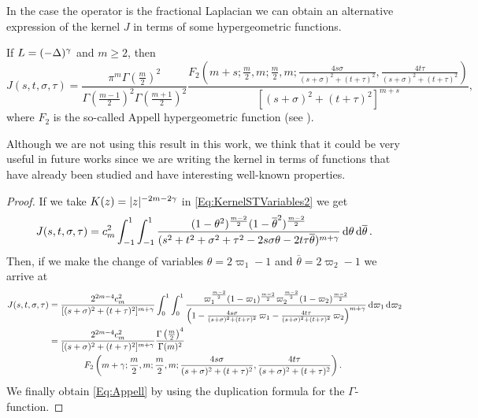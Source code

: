 In the case the operator is the fractional Laplacian we can obtain an alternative expression of the
kernel $J$ in terms of some hypergeometric functions.
\begin{lemma}
\label{Lemma:Appell} If $L = (-\Delta)^\gamma$ and $m\geq 2$, then
\begin{equation}
\label{Eq:Appell}
J(s,t,\sigma,\tau) = \frac{\pi^m\Gamma\left(\frac{m}{2}\right)^2}{\Gamma\left(\frac{m-1}{2}\right)^2\Gamma\left(\frac{m+1}{2}\right)^2} \frac{F_2\left( m+s;\frac{m}{2},m;\frac{m}{2},m;\frac{4s\sigma}{(s+\sigma)^2+(t+\tau)^2},\frac{4t\tau}{(s+\sigma)^2+(t+\tau)^2} \right)}{[(s+\sigma)^2+(t+\tau)^2]^{m+s}},
\end{equation}
where $F_2$ is the so-called Appell hypergeometric function (see \cite{Appell}).
\end{lemma}
Although we are not using this result in this work, we think that it could be very useful in future
works since we are writing the kernel in terms of functions that have already been studied and have
interesting well-known properties.


\begin{proof}
If we take $K(z) = |z|^{-2m-2\gamma}$ in \eqref{Eq:KernelSTVariables2} we get
\begin{align*}
J(s,t,\sigma, \tau) = c_m ^2  \int_{-1}^1  \int_{-1}^1  \frac{(1-\theta^2)^{\frac{m-2}{2}} (1-\overline{\theta}^2)^{\frac{m-2}{2}}}{(s^2 + t^2 + \sigma^2 + \tau^2 -2 s \sigma \theta -2 t \tau \overline{\theta})^{m+\gamma}} \,\mathrm{d} \theta \,\mathrm{d} \overline{\theta}\,.
\end{align*}
Then, if we make the change of variables $\theta = 2\varpi_1-1$ and $\overline{\theta}=2\varpi_2-1$
we arrive at
\begin{align*}
J(s,t,\sigma, \tau) &= \frac{2^{2m-4} c_m^2}{[(s+\sigma)^2+(t+\tau)^2]^{m+\gamma}} \int_0^1 \int_0^1
\frac{\varpi_1^\frac{m-2}{2} (1-\varpi_1)^\frac{m-2}{2} \varpi_2^\frac{m-2}{2}
(1-\varpi_2)^\frac{m-2}{2}}{\left(1-\frac{4s\sigma}{(s+\sigma)^2+(t+\tau)^2}\,\varpi_1-\frac{4t\tau}{(s+\sigma)^2+(t+\tau)^2}\,\varpi_2
\right)^{m+\gamma}} \,\mathrm{d} \varpi_1 \,\mathrm{d} \varpi_2 \\
&= \frac{2^{2m-4} c_m^2}{[(s+\sigma)^2+(t+\tau)^2]^{m+\gamma}} \frac{\Gamma\left(\frac{m}{2} \right)^4}{\Gamma(m)^2} \\
& \quad \quad \quad \quad F_2\left( m+\gamma;\frac{m}{2},m;\frac{m}{2},m;\frac{4s\sigma}{(s+\sigma)^2+(t+\tau)^2},\frac{4t\tau}{(s+\sigma)^2+(t+\tau)^2} \right).
\end{align*}
We finally obtain \eqref{Eq:Appell} by using the duplication formula for the $\Gamma$-function.
\end{proof}

